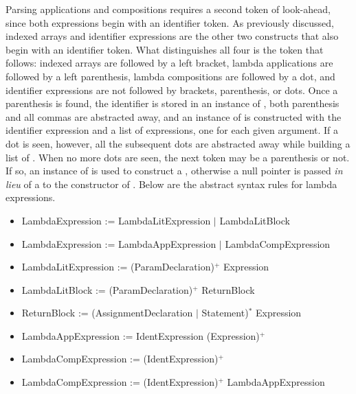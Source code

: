 Parsing applications and compositions requires a second token of look-ahead, since both expressions begin with an identifier token. As previously discussed, indexed arrays and identifier expressions are the other two constructs that also begin with an identifier token. What distinguishes all four is the token that follows: indexed arrays are followed by a left bracket, lambda applications are followed by a left parenthesis, lambda compositions are followed by a dot, and identifier expressions are not followed by brackets, parenthesis, or dots. Once a parenthesis is found, the identifier is stored in an instance of , both parenthesis and all commas are abstracted away, and an instance of  is constructed with the identifier expression and a list of expressions, one for each given argument. If a dot is seen, however, all the subsequent dots are abstracted away while building a list of . When no more dots are seen, the next token may be a parenthesis or not. If so, an instance of  is used to construct a , otherwise a null pointer is passed \emph{in lieu} of a  to the constructor of . Below are the abstract syntax rules for lambda expressions.

\begin{itemize}
	\item LambdaExpression := LambdaLitExpression $|$ LambdaLitBlock
	\item LambdaExpression := LambdaAppExpression $|$ LambdaCompExpression
	\item LambdaLitExpression := (ParamDeclaration)$^+$ Expression
	\item LambdaLitBlock := (ParamDeclaration)$^+$ ReturnBlock
	\item ReturnBlock := (AssignmentDeclaration $|$ Statement)$^*$ Expression
	\item LambdaAppExpression := IdentExpression (Expression)$^+$
	\item LambdaCompExpression := (IdentExpression)$^+$
	\item LambdaCompExpression := (IdentExpression)$^+$ LambdaAppExpression
\end{itemize}

